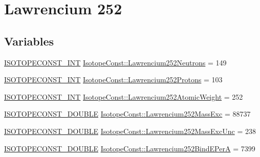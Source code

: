 \hypertarget{group___isotope_const-_lawrencium-_lr252}{}\section{Lawrencium 252}
\label{group___isotope_const-_lawrencium-_lr252}
\subsection*{Variables}
\begin{DoxyCompactItemize}
\item 
\mbox{\hyperlink{group___isotope_const-_macros_ga5f18360b3e99483a35c32d789e62621c}{I\+S\+O\+T\+O\+P\+E\+C\+O\+N\+S\+T\+\_\+\+I\+NT}} \mbox{\hyperlink{group___isotope_const-_lawrencium-_lr252_ga00fb18278990d7d63a6bd1caab1bacca}{Isotope\+Const\+::\+Lawrencium252\+Neutrons}} = 149
\item 
\mbox{\hyperlink{group___isotope_const-_macros_ga5f18360b3e99483a35c32d789e62621c}{I\+S\+O\+T\+O\+P\+E\+C\+O\+N\+S\+T\+\_\+\+I\+NT}} \mbox{\hyperlink{group___isotope_const-_lawrencium-_lr252_gaba8a458df9f67624544ec184c02cb1e2}{Isotope\+Const\+::\+Lawrencium252\+Protons}} = 103
\item 
\mbox{\hyperlink{group___isotope_const-_macros_ga5f18360b3e99483a35c32d789e62621c}{I\+S\+O\+T\+O\+P\+E\+C\+O\+N\+S\+T\+\_\+\+I\+NT}} \mbox{\hyperlink{group___isotope_const-_lawrencium-_lr252_ga94d2cf48ae849c63f46331e996882043}{Isotope\+Const\+::\+Lawrencium252\+Atomic\+Weight}} = 252
\item 
\mbox{\hyperlink{group___isotope_const-_macros_ga8f45a7272ce02c0b4c65c44636ed719a}{I\+S\+O\+T\+O\+P\+E\+C\+O\+N\+S\+T\+\_\+\+D\+O\+U\+B\+LE}} \mbox{\hyperlink{group___isotope_const-_lawrencium-_lr252_gaa7dc3aeec38e4c3c0b95b8e0478b7de5}{Isotope\+Const\+::\+Lawrencium252\+Mass\+Exc}} = 88737
\item 
\mbox{\hyperlink{group___isotope_const-_macros_ga8f45a7272ce02c0b4c65c44636ed719a}{I\+S\+O\+T\+O\+P\+E\+C\+O\+N\+S\+T\+\_\+\+D\+O\+U\+B\+LE}} \mbox{\hyperlink{group___isotope_const-_lawrencium-_lr252_ga79790563f2abf4294dd40cac55b5c927}{Isotope\+Const\+::\+Lawrencium252\+Mass\+Exc\+Unc}} = 238
\item 
\mbox{\hyperlink{group___isotope_const-_macros_ga8f45a7272ce02c0b4c65c44636ed719a}{I\+S\+O\+T\+O\+P\+E\+C\+O\+N\+S\+T\+\_\+\+D\+O\+U\+B\+LE}} \mbox{\hyperlink{group___isotope_const-_lawrencium-_lr252_ga9782a8203c70ee10ad65f3e894b5017e}{Isotope\+Const\+::\+Lawrencium252\+Bind\+E\+PerA}} = 7399
\item 

\end{DoxyCompactItemize}
